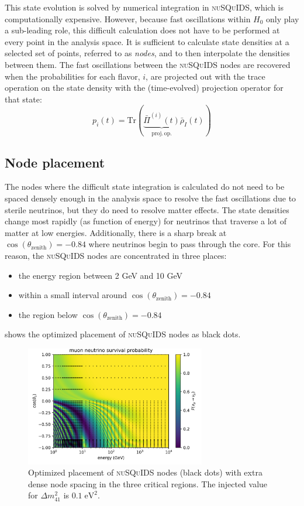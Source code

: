 This state evolution is solved by numerical integration in \textsc{nuSQuIDS}, which is computationally expensive.
However, because fast oscillations within $ H_0$ only play a sub-leading role, this difficult calculation does not have to be performed at every point in the analysis space.
It is sufficient to calculate state densities at a selected set of points, referred to as \emph{nodes}, and to then interpolate the densities between them.
The fast oscillations between the \textsc{nuSQuIDS} nodes are recovered when the probabilities for each flavor, $i$, are projected out with the trace operation on the state density with the (time-evolved) projection operator for that state:
\begin{equation}
p_i(t)=\mathrm{Tr}(\underbrace{\bar{\Pi}^{(i)}(t)}_{\mathrm{proj.\,op.}}\bar{\rho}_I(t))
\end{equation}

\subsection{Node placement}
The nodes where the difficult state integration is calculated do not need to be spaced densely enough in the analysis space to resolve the fast oscillations due to sterile neutrinos, but they do need to resolve matter effects. The state densities change most rapidly (as function of energy) for neutrinos that traverse a lot of matter at low energies. Additionally, there is a sharp break at $\cos(\theta_{\mathrm{zenith}})=-0.84$ where neutrinos begin to pass through the core.
For this reason, the \textsc{nuSQuIDS} nodes are concentrated in three places:
\begin{itemize}
    \item the energy region between 2 GeV and 10 GeV
    \item within a small interval around $\cos(\theta_{\mathrm{zenith}})=-0.84$
    \item the region below $\cos(\theta_{\mathrm{zenith}})=-0.84$
\end{itemize}
 shows the optimized placement of \textsc{nuSQuIDS} nodes as black dots.

\begin{figure}
    \centering
    \includegraphics[width=0.7\textwidth]{figures/measurement/sterile_analysis/nusquids/0.1eV_sterile_only_height_avg_optim_nodes.png}
    \caption{Optimized placement of \textsc{nuSQuIDS} nodes (black dots) with extra dense node spacing in the three critical regions. The injected value for $\Delta m^2_{41}$ is $0.1\;\mathrm{eV^2}$.}
    \label{fig:nusquids-nodes}
\end{figure}

